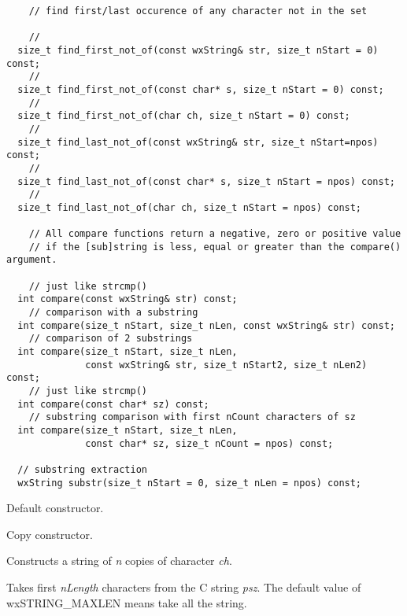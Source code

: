 {\begin{verbatim}
    // find first/last occurence of any character not in the set

    //
  size_t find_first_not_of(const wxString& str, size_t nStart = 0) const;
    //
  size_t find_first_not_of(const char* s, size_t nStart = 0) const;
    //
  size_t find_first_not_of(char ch, size_t nStart = 0) const;
    //
  size_t find_last_not_of(const wxString& str, size_t nStart=npos) const;
    //
  size_t find_last_not_of(const char* s, size_t nStart = npos) const;
    //
  size_t find_last_not_of(char ch, size_t nStart = npos) const;

    // All compare functions return a negative, zero or positive value
    // if the [sub]string is less, equal or greater than the compare() argument.

    // just like strcmp()
  int compare(const wxString& str) const;
    // comparison with a substring
  int compare(size_t nStart, size_t nLen, const wxString& str) const;
    // comparison of 2 substrings
  int compare(size_t nStart, size_t nLen,
              const wxString& str, size_t nStart2, size_t nLen2) const;
    // just like strcmp()
  int compare(const char* sz) const;
    // substring comparison with first nCount characters of sz
  int compare(size_t nStart, size_t nLen,
              const char* sz, size_t nCount = npos) const;

  // substring extraction
  wxString substr(size_t nStart = 0, size_t nLen = npos) const;
\end{verbatim}


\label{wxstringconstruct}


Default constructor.


Copy constructor.


Constructs a string of {\it n} copies of character {\it ch}.


Takes first {\it nLength} characters from the C string {\it psz}.
The default value of wxSTRING\_MAXLEN means take all the string.

}
